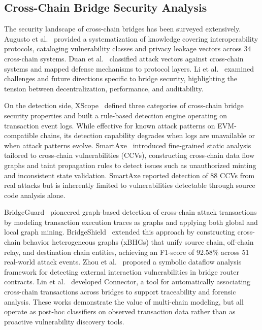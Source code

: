 \documentclass[journal]{IEEEtran}
\begin{document}
\subsection{Cross-Chain Bridge Security Analysis}

The security landscape of cross-chain bridges has been surveyed extensively. Augusto et al.~\cite{augusto2024sok} provided a systematization of knowledge covering interoperability protocols, cataloging vulnerability classes and privacy leakage vectors across 34 cross-chain systems. Duan et al.~\cite{duan2023attacks} classified attack vectors against cross-chain systems and mapped defense mechanisms to protocol layers. Li et al.~\cite{li2025blockchain} examined challenges and future directions specific to bridge security, highlighting the tension between decentralization, performance, and auditability.

On the detection side, XScope~\cite{zhang2022xscope} defined three categories of cross-chain bridge security properties and built a rule-based detection engine operating on transaction event logs. While effective for known attack patterns on EVM-compatible chains, its detection capability degrades when logs are unavailable or when attack patterns evolve. SmartAxe~\cite{liao2024smartaxe} introduced fine-grained static analysis tailored to cross-chain vulnerabilities (CCVs), constructing cross-chain data flow graphs and taint propagation rules to detect issues such as unauthorized minting and inconsistent state validation. SmartAxe reported detection of 88 CCVs from real attacks but is inherently limited to vulnerabilities detectable through source code analysis alone.

BridgeGuard~\cite{wu2025safeguarding} pioneered graph-based detection of cross-chain attack transactions by modeling transaction execution traces as graphs and applying both global and local graph mining. BridgeShield~\cite{lin2025bridgeshield} extended this approach by constructing cross-chain behavior heterogeneous graphs (xBHGs) that unify source chain, off-chain relay, and destination chain entities, achieving an F1-score of 92.58\% across 51 real-world attack events. Zhou et al.~\cite{zhou2025bridgeguard} proposed a symbolic dataflow analysis framework for detecting external interaction vulnerabilities in bridge router contracts. Lin et al.~\cite{lin2025connector} developed Connector, a tool for automatically associating cross-chain transactions across bridges to support traceability and forensic analysis. These works demonstrate the value of multi-chain modeling, but all operate as post-hoc classifiers on observed transaction data rather than as proactive vulnerability discovery tools.
\end{document}
